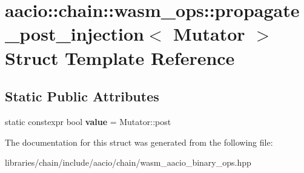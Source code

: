 \hypertarget{structaacio_1_1chain_1_1wasm__ops_1_1propagate__post__injection_3_01_mutator_01_4}{}\section{aacio\+:\+:chain\+:\+:wasm\+\_\+ops\+:\+:propagate\+\_\+post\+\_\+injection$<$ Mutator $>$ Struct Template Reference}
\label{structaacio_1_1chain_1_1wasm__ops_1_1propagate__post__injection_3_01_mutator_01_4}
\subsection*{Static Public Attributes}
\begin{DoxyCompactItemize}
\item 
\mbox{\label{structaacio_1_1chain_1_1wasm__ops_1_1propagate__post__injection_3_01_mutator_01_4_af6ed5fe750998d3edd0a9591e07b049c}} 
static constexpr bool {\bfseries value} = Mutator\+::post
\end{DoxyCompactItemize}


The documentation for this struct was generated from the following file\+:\begin{DoxyCompactItemize}
\item 
libraries/chain/include/aacio/chain/wasm\+\_\+aacio\+\_\+binary\+\_\+ops.\+hpp\end{DoxyCompactItemize}
